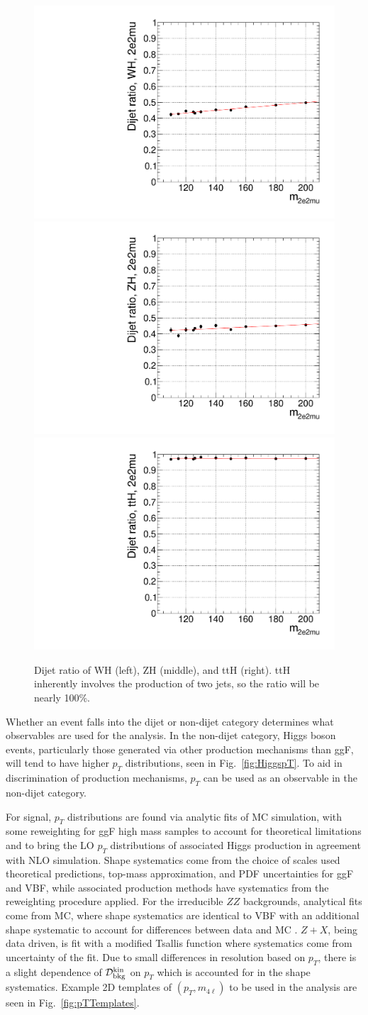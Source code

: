 \begin{figure}[htbp]
\begin{center}
\includegraphics[width=.3\linewidth]{HiggsDiscovery/figures/eff_WH_2e2mu_ratio.pdf}
\includegraphics[width=.3\linewidth]{HiggsDiscovery/figures/eff_ZH_2e2mu_ratio.pdf}
\includegraphics[width=.3\linewidth]{HiggsDiscovery/figures/eff_ttH_2e2mu_ratio.pdf}
\caption[Dijet Ratio of Associated Production as Function of $m_H$]{Dijet ratio of WH (left), ZH (middle), and ttH (right). ttH inherently involves the production of two jets, so the ratio will be nearly 100\%.}
\label{fig:DijetRatioAss}
\end{center}
\end{figure}

Whether an event falls into the dijet or non-dijet category determines what observables are used for the analysis. In the non-dijet category, Higgs boson events, particularly those generated via other production mechanisms than ggF, will tend to have higher $p_T$ distributions, seen in Fig.~\ref{fig:HiggspT}. To aid in discrimination of production mechanisms, $p_T$ can be used as an observable in the non-dijet category.

For signal, $p_T$ distributions are found via analytic fits of MC simulation, with some reweighting for ggF high mass samples to account for theoretical limitations and to bring the LO $p_T$ distributions of associated Higgs production in agreement with NLO simulation. Shape systematics come from the choice of scales used theoretical predictions, top-mass approximation, and PDF uncertainties for ggF and VBF, while associated production methods have systematics from the reweighting procedure applied. For the irreducible $ZZ$ backgrounds, analytical fits come from MC, where shape systematics are identical to VBF with an additional shape systematic to account for differences between data and MC \cite{ZZpTShapeSyst:2012}. $Z+X$, being data driven, is fit with a modified Tsallis function \cite{Tsallis:2012} where systematics come from uncertainty of the fit. Due to small differences in resolution based on $p_T$, there is a slight dependence of $\mathcal{D}_{\rm{bkg}}^{\rm{kin}}$ on $p_T$ which is accounted for in the shape systematics. Example 2D templates of $(p_T,m_{4\ell})$ to be used in the analysis are seen in Fig.~\ref{fig:pTTemplates}.

